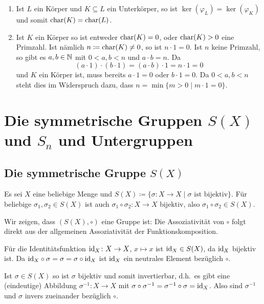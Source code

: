 \begin{bem}
 \begin{enumerate}[leftmargin=*]
  \item
   Ist $L$ ein Körper und $K \subseteq L$ ein Unterkörper, so ist $\ker(\varphi_L) = \ker(\varphi_K)$ und somit $\mathrm{char}(K) = \mathrm{char}(L)$.
  \item
   Ist $K$ ein Körper so ist entweder $\mathrm{char}(K) = 0$, oder $\mathrm{char}(K) > 0$ eine Primzahl. Ist nämlich $n \coloneqq \mathrm{char}(K) \neq 0$, so ist $n \cdot 1 = 0$. Ist $n$ keine Primzahl, so gibt es $a, b \in \mathbb{N}$ mit $0 < a,b < n$ und $a \cdot b = n$. Da
   \[
    (a \cdot 1) \cdot (b \cdot 1)
    = (a \cdot b) \cdot 1
    = n \cdot 1
    = 0
   \]
   und $K$ ein Körper ist, muss bereits $a \cdot 1 = 0$ oder $b \cdot 1 = 0$. Da $0 < a,b < n$ steht dies im Widerspruch dazu, dass $n = \min \{m > 0 \mid m \cdot 1 = 0\}$.
 \end{enumerate}
\end{bem}





\section{Die symmetrische Gruppen \texorpdfstring{$S(X)$}{S(X)} und \texorpdfstring{$S_n$}{Sn} und Untergruppen}



\subsection{Die symmetrische Gruppe \texorpdfstring{$S(X)$}{S(X)}}

Es sei $X$ eine beliebige Menge und $S(X) \coloneqq \{\sigma \colon X \to X \mid \text{$\sigma$ ist bijektiv}\}$. Für beliebige $\sigma_1, \sigma_2 \in S(X)$ ist auch $\sigma_1 \circ \sigma_2 \colon X \to X$ bijektiv, also $\sigma_1 \circ \sigma_2 \in S(X)$.

Wir zeigen, dass $(S(X), \circ)$ eine Gruppe ist: Die Assoziativität von $\circ$ folgt direkt aus der allgemeinen Assoziativität der Funktionskomposition.

Für die Identitätsfunktion $\mathrm{id}_X \colon X \to X$, $x \mapsto x$ ist $\mathrm{id}_X \in S(X)$, da $\mathrm{id}_X$ bijektiv ist. Da $\mathrm{id}_X \circ \sigma = \sigma = \sigma \circ \mathrm{id}_X$ ist $\mathrm{id}_X$ ein neutrales Element bezüglich $\circ$.

Ist $\sigma \in S(X)$ so ist $\sigma$ bijektiv und somit invertierbar, d.h.\ es gibt eine (eindeutige) Abbildung $\sigma^{-1} \colon X \to X$ mit $\sigma \circ \sigma^{-1} = \sigma^{-1} \circ \sigma = \mathrm{id}_X$. Also sind $\sigma^{-1}$ und $\sigma$ invers zueinander bezüglich $\circ$.

